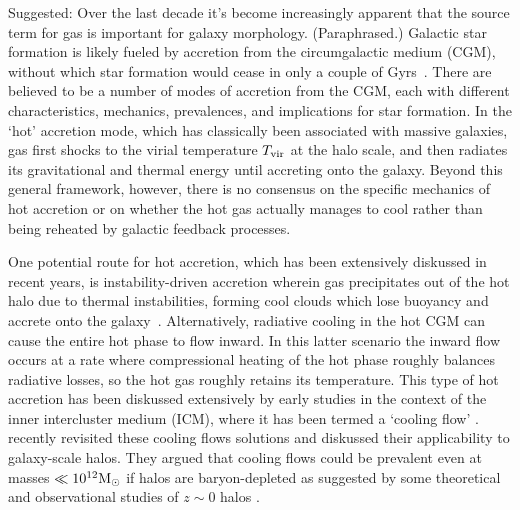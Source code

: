 \documentclass[fleqn,usenatbib]{mnras}
\newcommand{\Tvir}{T_{\rm vir}}
\newcommand{\msun}{{\rm M}_\odot}
\begin{document}
Suggested: Over the last decade it's become increasingly apparent that the source term for gas is important for galaxy morphology. (Paraphrased.)
Galactic star formation is likely fueled by accretion from the circumgalactic medium (CGM), without which star formation would cease in only a couple of Gyrs~\cite[e.g.][]{Prochaska2009, Bauermeister2010, Spring2017}.
There are believed to be a number of modes of accretion from the CGM, each with different characteristics, mechanics, prevalences, and implications for star formation.
In the `hot' accretion mode, which has classically been associated with massive galaxies, gas first shocks to the virial temperature $\Tvir$ at the halo scale, and then radiates its gravitational and thermal energy until accreting onto the galaxy. Beyond this general framework, however, there is no consensus on the specific mechanics of hot accretion or on whether the hot gas actually manages to cool rather than being reheated by galactic feedback processes. 

One potential route for hot accretion, which has been extensively diskussed in recent years, is instability-driven accretion wherein gas precipitates out of the hot halo due to thermal instabilities, forming cool clouds which lose buoyancy and accrete onto the galaxy~\citep[e.g.][]{Maller2004, Mccourt2012, Voit2015, Armillotta2016, Gronke2019a, Voit2021}.
Alternatively, radiative cooling in the hot CGM can cause the entire hot phase to flow inward.
In this latter scenario the inward flow occurs at a rate where compressional heating of the hot phase roughly balances radiative losses, so the hot gas roughly retains its temperature.
This type of hot accretion has been diskussed extensively by early studies in the context of the inner intercluster medium (ICM), where it has been termed a `cooling flow' \citep[][see \citealt{McNamara2007} for a review]{Mathews78, Cowie80, Fabian84, balbus88, Bertschinger1989}. \cite{Stern2019, Stern2020a} recently revisited these cooling flows solutions and diskussed  their applicability to galaxy-scale halos.
They argued that cooling flows could be prevalent even at masses $\ll10^{12}\msun$ if halos are baryon-depleted as suggested by some theoretical and observational studies of $z\sim0$ halos \citep[e.g.,][]{Bregman2018, Hafen2019}. 
\end{document}
